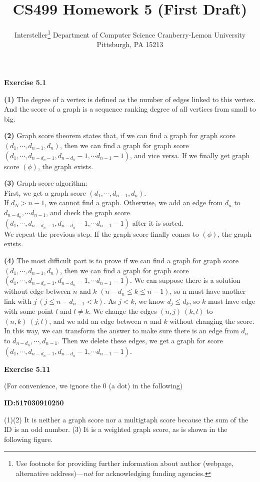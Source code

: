 \documentclass{article} %
\title{CS499 Homework 5 (First Draft)}
\author{
	Intersteller\thanks{ Use footnote for providing further information
		about author (webpage, alternative address)---\emph{not} for acknowledging
		funding agencies.}
	Department of Computer Science
	Cranberry-Lemon University
	Pittsburgh, PA 15213
}
\begin{document}
	\maketitle
	\textbf{Exercise 5.1}\par

\textbf{(1)} The degree of a vertex is defined as the number of edges linked to this vertex. And the score of a graph is a sequence ranking degree of all vertices from small to big.\par

\textbf{(2)} Graph score theorem states that, if we can find a graph for graph score $(d_1, \cdots ,d_{n-1},d_n)$, then we can find a graph for graph score $(d_1, \cdots ,d_{n-d_n-1},d_{n-d_n}-1,\cdots d_{n-1}-1)$, and vice versa. If we finally get graph score $(\phi)$, the graph exists.\par

\textbf{(3)} Graph score algorithm:\\
First, we get a graph score $(d_1, \cdots ,d_{n-1},d_n)$.\\
If $d_N>n-1$, we cannot find a graph. Otherwise, we add an edge from $d_n$ to $d_{n-d_n},\cdots d_{n-1}$, and check the graph score $(d_1, \cdots ,d_{n-d_n-1},d_{n-d_n}-1,\cdots d_{n-1}-1)$ after it is sorted.\\
We repeat the previous step. If the graph score finally comes to $(\phi)$, the graph exists.\par

\textbf{(4)} The most difficult part is to prove if we can find a graph for graph score $(d_1, \cdots ,d_{n-1},d_n)$, then we can find a graph for graph score $(d_1, \cdots ,d_{n-d_n-1},d_{n-d_n}-1,\cdots d_{n-1}-1)$. We can suppose there is a solution without edge between $n$ and $k$ $(n-d_n\leq k\leq n-1)$, so n must have another link with $j \ (j\leq n-d_{n-1}<k)$. As $j<k$, we know $d_j\leq d_k$, so $k$ must have edge with some point $l$ and $l\neq k$. We change the edges $(n,j)\  (k,l)$ to $(n,k)\  (j,l)$, and we add an edge between $n$ and $k$ without changing the score. In this way, we can transform the answer to make sure there is an edge from $d_n$ to $d_{n-d_n},\cdots ,d_{n-1}$. Then we delete these edges, we get a graph for score $(d_1, \cdots ,d_{n-d_n-1},d_{n-d_n}-1,\cdots d_{n-1}-1)$.\par




	\textbf{Exercise 5.11}\par
	(For convenience, we ignore the 0 (a dot) in the following)\par
	\textbf{ID:517030910250}\par
	(1)(2) It is neither a graph score nor a multigtaph score because the sum of the ID is an odd number.
	(3) It is a weighted graph score, as is shown in the following figure.
	
\end{document}
